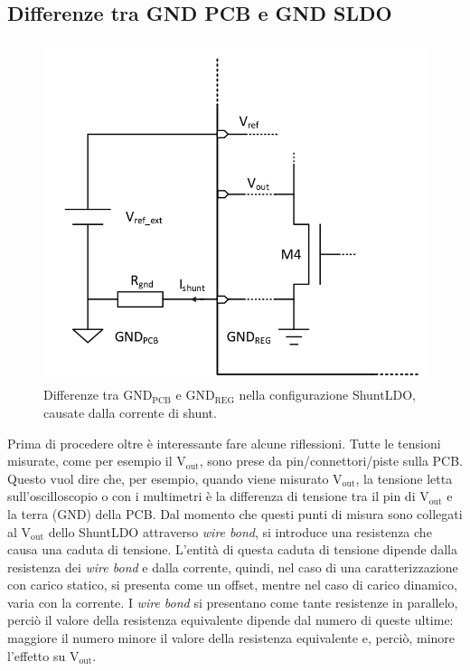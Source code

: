 \subsection{Differenze tra GND PCB e GND SLDO}

\begin{figure}[!ht]
\centering
\includegraphics[scale=.3]{Immagini/Ground}
\caption{Differenze tra $\mathrm{GND_{PCB}}$ e $\mathrm{GND_{REG}}$ nella configurazione ShuntLDO, causate dalla corrente di shunt.}
\label{Ground}
\end{figure}
Prima di procedere oltre è interessante fare alcune riflessioni.%
Tutte le tensioni misurate, come per esempio il $\mathrm{V_{out}}$, sono prese da pin/connettori/piste sulla PCB.
Questo vuol dire che, per esempio, quando viene misurato $\mathrm{V_{out}}$, la tensione letta sull'oscilloscopio o con i multimetri è la differenza di tensione tra il pin di $\mathrm{V_{out}}$ e la terra (GND) della PCB. 
Dal momento che questi punti di misura sono collegati al $\mathrm{V_{out}}$ dello ShuntLDO attraverso \textit{wire bond}, si introduce una resistenza che causa una caduta di tensione. 
L'entità di questa caduta di tensione dipende dalla resistenza dei \textit{wire bond} e dalla corrente, quindi, nel caso di una caratterizzazione con carico statico, si presenta come un offset, mentre nel caso di carico dinamico, varia con la corrente. 
I \textit{wire bond} si presentano come tante resistenze in parallelo, perciò il valore della resistenza equivalente dipende dal numero di queste ultime: maggiore il numero minore il valore della resistenza equivalente e, perciò, minore l'effetto su $\mathrm{V_{out}}$.

